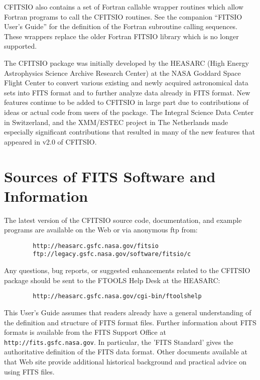\documentclass[11pt]{book}
\begin{document}
CFITSIO also contains a set of Fortran callable wrapper routines which
allow Fortran programs to call the CFITSIO routines.  See the companion
``FITSIO User's Guide'' for the definition of the Fortran subroutine
calling sequences.  These wrappers replace the older Fortran FITSIO
library which is no longer supported.

The CFITSIO package was initially developed by the HEASARC (High Energy
Astrophysics Science Archive Research Center) at the NASA Goddard Space
Flight Center to convert various existing and newly acquired
astronomical data sets into FITS format and to further analyze data
already in FITS format.  New features continue to be added to CFITSIO
in large part due to contributions of ideas or actual code from
users of the package.  The Integral Science Data Center in Switzerland,
and the XMM/ESTEC project in The Netherlands made especially significant
contributions that resulted in many of the new features that appeared
in v2.0 of CFITSIO.


\section{Sources of FITS Software and Information}

The latest version of the CFITSIO source code,
documentation, and example programs are available on the
Web or via anonymous ftp from:

\begin{verbatim}
        http://heasarc.gsfc.nasa.gov/fitsio
        ftp://legacy.gsfc.nasa.gov/software/fitsio/c
\end{verbatim}

Any questions, bug reports, or suggested enhancements related to the CFITSIO
package should be sent to the FTOOLS Help Desk at the HEASARC:

\begin{verbatim}
        http://heasarc.gsfc.nasa.gov/cgi-bin/ftoolshelp
\end{verbatim}

This User's Guide assumes that readers already have a general
understanding of the definition and structure of FITS format files.
Further information about FITS formats is available from the FITS Support
Office at {\tt http://fits.gsfc.nasa.gov}.  In particular, the
'FITS Standard' gives the authoritative definition of the FITS data
format.  Other documents available at that Web site
provide additional historical background
and practical advice on using FITS files.
\end{document}
